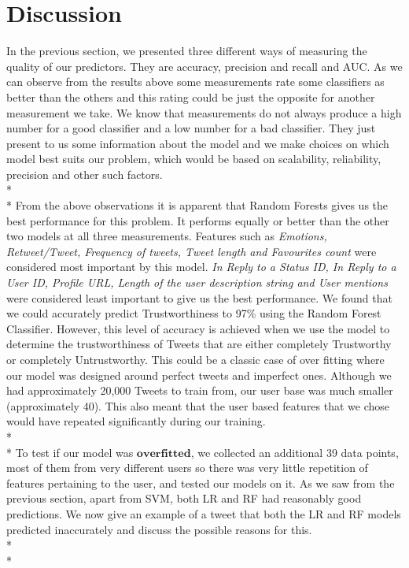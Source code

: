 \section{Discussion}
In the previous section, we presented three different ways of measuring the quality of our predictors. They are accuracy, precision and recall and AUC. As we can observe from the results above some measurements rate some classifiers as better than the others and this rating could be just the opposite for another measurement we take. We know that  measurements do not always produce a high number for a good classifier and a low number for a bad classifier.  They just present to us some information about the model and we make choices on which model best suits our problem, which would be based on scalability, reliability, precision and other such factors.\\*\\* 
From the above observations it is apparent that Random Forests gives us the best performance for this problem. It performs equally or better than the other two models at all three measurements. Features such as \textit{Emotions, Retweet/Tweet, Frequency of tweets, Tweet length and Favourites count} were considered most important by this model. \textit{In Reply to a Status ID, In Reply to a User ID,  Profile URL, Length of the user description string and User mentions} were considered least important to give us the best performance.  We found that we could accurately predict Trustworthiness to 97\% using the Random Forest Classifier. However, this level of accuracy is achieved when we use the model to determine the trustworthiness of Tweets that are either completely Trustworthy or completely Untrustworthy. This could be a classic case of over fitting where our model was designed around perfect tweets and imperfect ones. Although we had approximately 20,000 Tweets to train from, our user base was much smaller (approximately 40). This also meant that the user based features that we chose would have repeated significantly during our training. \\*\\*
To test if our model was $\textbf{overfitted}$, we collected an additional 39 data points, most of them from very different users so there was very little repetition of features pertaining to the user, and tested our models on it. As we saw from the previous section, apart from SVM, both LR and RF had reasonably good predictions. We now give an example of a tweet that both the LR and RF models predicted inaccurately and discuss the possible reasons for this. \\*\\*
